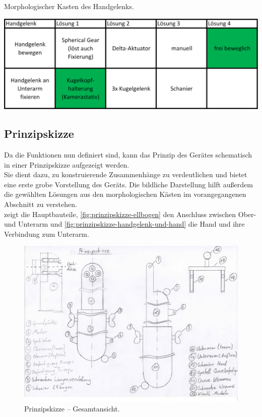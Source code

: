 %
			\begin{table}[h]
				\centering
				\caption[Morphologischer Kasten des Handgelenks]{Morphologischer Kasten des Handgelenks.}
				\includegraphics[width=.8\textwidth]{Abb/MorphoBoxes/Morphologischer_Kasten_Handgelenk.png}\label{tab:morphologische-kasten-handgelenk}
			\end{table}
%

		\subsection{Prinzipskizze}
			Da die Funktionen nun definiert sind, kann das Prinzip des Gerätes schematisch in einer Prinzipskizze aufgezeigt werden.\\
			Sie dient dazu, zu konstruierende Zusammenhänge zu verdeutlichen und bietet eine erste grobe Vorstellung des Geräts. Die bildliche Darstellung hilft außerdem die gewählten Lösungen aus den morphologischen Kästen im vorangegangenen Abschnitt zu verstehen.\\
			 zeigt die Hauptbauteile, \cref{fig:prinzipskizze-ellbogen} den Anschluss zwischen Ober- und Unterarm und \cref{fig:prinzipskizze-handgelenk-und-hand} die Hand und ihre Verbindung zum Unterarm.

			\begin{figure}[h]
				\centering
				\includegraphics[width=\textwidth]{Abb/Prinzipskizze_Gesamtansicht}
				\caption[Prinzipskizze -- Gesamtansicht]{Prinzipskizze -- Gesamtansicht.}\label{fig:prinzipskizze-gesamtansicht}
			\end{figure}

